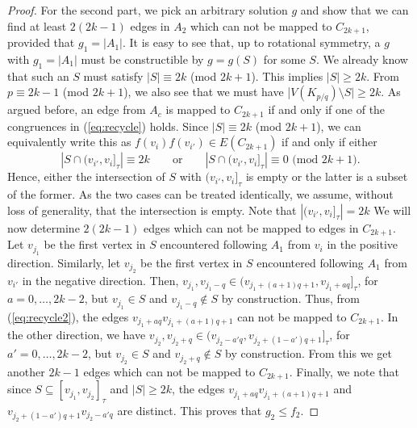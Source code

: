 \documentclass[11pt,a4paper]{article}
\begin{document}
\begin{proof}
For the second part, we pick an arbitrary solution $g$ and show that we can
find at least $2(2k-1)$ edges in $A_2$ which can not be mapped to $C_{2k+1}$,
provided that $g_1 = |A_1|$.
It is easy to see that, up to rotational symmetry, a $g$ with $g_1 = |A_1|$ 
must be constructible by $g = g(S)$ for some $S$. 
We already know that such an $S$ must satisfy $|S| \equiv 2k$ (mod $2k+1$).
This implies $|S| \geq 2k$.
From $p \equiv 2k-1$ (mod $2k+1$), we also see that we must have
|$V(K_{p/q}) \setminus S| \geq 2k$.
As argued before, an edge from $A_c$ is mapped to $C_{2k+1}$ if and only if one of the
congruences in (\ref{eq:recycle}) holds.
Since $|S| \equiv 2k$ (mod $2k+1$), we can equivalently write this as
$f(v_i) f(v_{i'}) \in E(C_{2k+1})$ if and only if
either 
\begin{equation}
\label{eq:recycle2}
|S \cap (v_{i'},v_{i}]_{\tau}| \equiv 2k \qquad \text{or} \qquad
|S \cap (v_{i'},v_{i}]_{\tau}| \equiv 0 \text{ (mod $2k+1$)}.
\end{equation}
Hence, either the intersection of $S$ with $(v_{i'},v_{i}]_{\tau}$ is empty or
the latter is a subset of the former.
As the two cases can be treated identically, we assume, 
without loss of generality, that the intersection is empty.
Note that $|(v_{i'},v_{i}]_{\tau}| = 2k$
We will now determine $2(2k-1)$ edges which can not be mapped to edges
in $C_{2k+1}$.
Let $v_{j_{1}}$ be the first vertex in $S$ encountered following $A_1$ from $v_i$ in
the positive direction.
Similarly, let $v_{j_{2}}$ be the first vertex in $S$ encountered following $A_1$ 
from $v_{i'}$ in the negative direction.
Then, $v_{j_{1}}, v_{j_{1}-q} \in (v_{j_{1}+(a+1)q+1}, v_{j_{1}+aq}]_{\tau}$,
for $a = 0, \ldots, 2k-2$,
but $v_{j_{1}} \in S$ and $v_{j_{1}-q} \not\in S$ by construction.
Thus, from (\ref{eq:recycle2}), the edges $v_{j_{1}+aq} v_{j_{1} +(a+1)q+1}$ 
can not be mapped to $C_{2k+1}$.
In the other direction, we have $v_{j_{2}}, v_{j_{2}+q} \in (v_{j_{2}-a'q}, v_{j_{2}+(1-a')q+1}]_{\tau}$,
for $a' = 0, \ldots, 2k-2$,
but $v_{j_{2}} \in S$ and $v_{j_{2}+q} \not\in S$ by construction.
From this we get another $2k-1$ edges which can not be mapped to $C_{2k+1}$.
Finally, we note that since $S \subseteq [v_{j_1}, v_{j_2}]_{\tau}$ and
$|S| \geq 2k$, the edges
$v_{j_{1}+aq} v_{j_{1} +(a+1)q+1}$ and
$v_{j_{2}+(1-a')q+1} v_{j_{2}-a'q}$ are distinct.
This proves that $g_2 \leq f_2$.
\end{proof}
\end{document}
